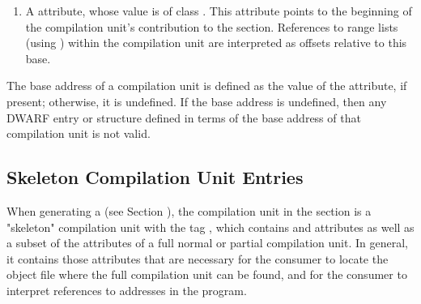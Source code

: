 \begin{enumerate}[1. ]
\item A \DWATrangesbaseDEFN{}
\hypertarget{chap:DWATrangesbaseforrangelists}{}
attribute, whose value is of class \CLASSrangelistptr.
This attribute points to the beginning of the compilation
unit's contribution to the \dotdebugranges{} section.
References to range lists (using \DWFORMsecoffset)
within the compilation unit are
interpreted as offsets relative to this base.

\end{enumerate}

The  base address of a compilation unit is defined as the
value of the \DWATlowpc{} attribute, if present; otherwise,
it is undefined. If the base address is undefined, then any
DWARF entry or structure defined in terms of the base address
of that compilation unit is not valid.

\subsection{Skeleton Compilation Unit Entries}
\label{chap:skeletoncompilationunitentries}
When generating a \splitDWARFobjectfile{} (see 
Section ), the
compilation unit in the \dotdebuginfo{} section is a "skeleton"
compilation unit with the tag \DWTAGcompileunit, which contains 
\DWATdwoname{} and \DWATdwoid{} attributes as well as a subset of the
attributes of a full normal or partial compilation unit. In general, 
it contains those attributes that are necessary for the consumer
to locate the object file where the full compilation unit
can be found, and for the consumer to interpret references to
addresses in the program. 

